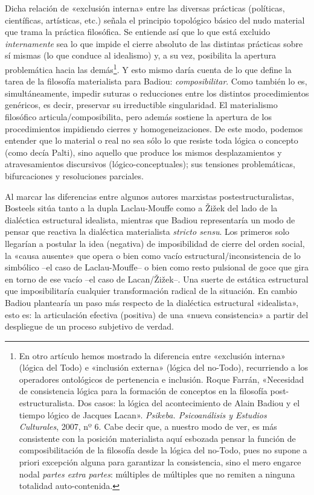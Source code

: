 Dicha relación de «exclusión interna» entre las diversas prácticas (políticas, científicas, artísticas, etc.) señala el principio topológico básico del nudo material que trama la práctica filosófica. Se entiende así que lo que está excluido \emph{internamente} sea lo que impide el cierre absoluto de las distintas prácticas sobre sí mismas (lo que conduce al idealismo) y, a su vez, posibilita la apertura problemática hacia las demás\footnote{En otro artículo hemos mostrado la diferencia entre «exclusión interna» (lógica del Todo) e «inclusión externa» (lógica del no-Todo), recurriendo a los operadores ontológicos de pertenencia e inclusión. Roque Farrán, «Necesidad de consistencia lógica para la formación de conceptos en la filosofía post-estructuralista. Dos casos: la lógica del acontecimiento de Alain Badiou y el tiempo lógico de Jacques Lacan». \emph{Psikeba. Psicoanálisis y Estudios Culturales}, 2007, nº 6. Cabe decir que, a nuestro modo de ver, es más consistente con la posición materialista aquí esbozada pensar la función de composibilitación de la filosofía desde la lógica del no-Todo, pues no supone a priori excepción alguna para garantizar la consistencia, sino el mero engarce nodal \emph{partes extra partes}: múltiples de múltiples que no remiten a ninguna totalidad auto-contenida.}. Y esto mismo daría cuenta de lo que define la tarea de la filosofía materialista para Badiou: \emph{composibilitar}. Como también lo es, simultáneamente, impedir suturas o reducciones entre los distintos procedimientos genéricos, es decir, preservar su irreductible singularidad. El materialismo filosófico articula/composibilita, pero además sostiene la apertura de los procedimientos impidiendo cierres y homogeneizaciones. De este modo, podemos entender que lo material o real no sea sólo lo que resiste toda lógica o concepto (como decía Palti), sino aquello que produce los mismos desplazamientos y atravesamientos discursivos (lógico-conceptuales); sus tensiones problemáticas, bifurcaciones y resoluciones parciales.

Al marcar las diferencias entre algunos autores marxistas postestructuralistas, Bosteels sitúa tanto a la dupla Laclau-Mouffe como a Žižek del lado de la dialéctica estructural idealista, mientras que Badiou representaría un modo de pensar que reactiva la dialéctica materialista \emph{stricto sensu}. Los primeros solo llegarían a postular la idea (negativa) de imposibilidad de cierre del orden social, la «causa ausente» que opera o bien como vacío estructural/inconsistencia de lo simbólico --el caso de Laclau-Mouffe-- o bien como resto pulsional de goce que gira en torno de ese vacío --el caso de Lacan/Žižek--. Una suerte de estática estructural que imposibilitaría cualquier transformación radical de la situación. En cambio Badiou plantearía un paso más respecto de la dialéctica estructural «idealista», esto es: la articulación efectiva (positiva) de una «nueva consistencia» a partir del despliegue de un proceso subjetivo de verdad.

